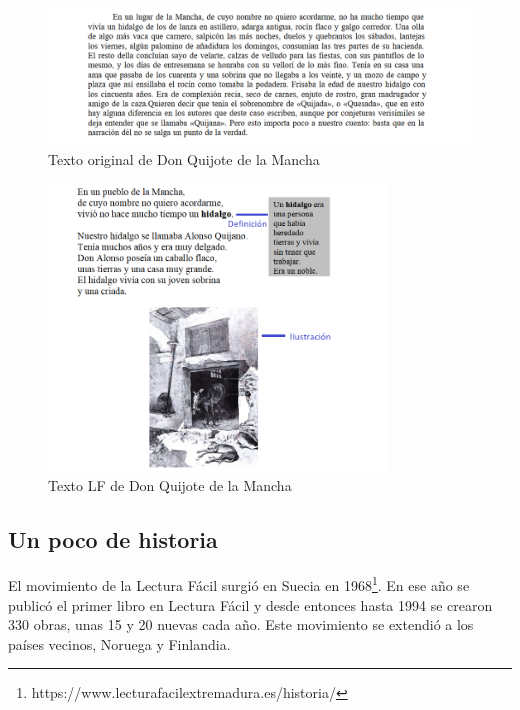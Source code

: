  \setlength{\parskip}{10pt}
 

\begin{figure}[htb]
	\centering
	\includegraphics[width=1.10\textwidth]{Imagenes/Ejemplos/Cap1DonQuijote}
	\caption{Texto original de Don Quijote de la Mancha}
	\label{fig:Quijote}
\end{figure} 


\begin{figure}[htb]
	\centering
	\includegraphics[width=0.8\textwidth]{Imagenes/Ejemplos/Cap1DonQuijoteLF}
	\caption{Texto LF de Don Quijote de la Mancha}
	\label{fig:QuijoteLF}
\end{figure}




\subsection{Un poco de historia}
El movimiento de la Lectura Fácil surgió en Suecia en 1968\footnote{https://www.lecturafacilextremadura.es/historia/}. En ese año se publicó el primer libro en Lectura Fácil y desde entonces hasta 1994 se crearon 330 obras, unas 15 y 20 nuevas cada año. Este movimiento se extendió a los países vecinos, Noruega y Finlandia.

